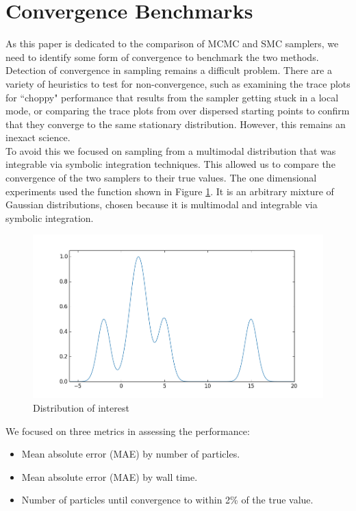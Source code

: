 \documentclass[12pt]{elsarticle}
\begin{document}
\section*{Convergence Benchmarks}
As this paper is dedicated to the comparison of MCMC and SMC samplers, we need to identify some form of convergence to benchmark the two methods. Detection of convergence in sampling remains a difficult problem.  There are a variety of heuristics to test for non-convergence, such as examining the trace plots for ``choppy" performance that results from the sampler getting stuck in a local mode, or comparing the trace plots from over dispersed starting points to confirm that they converge to the same stationary distribution. However, this remains an inexact science.\\

To avoid this we focused on sampling from a multimodal distribution that was integrable via symbolic integration techniques. This allowed us to compare the convergence of the two samplers to their true values. The one dimensional experiments used the function shown in Figure \ref{function}. It is an arbitrary mixture of Gaussian distributions, chosen because it is multimodal and integrable via symbolic integration.

\begin{figure}[htbp]
\begin{center}
\includegraphics[width = \textwidth]{plots/function.png}
\caption{Distribution of interest}
\label{function}
\end{center}
\end{figure}

We focused on three metrics in assessing the performance:
\begin{itemize}
\item Mean absolute error (MAE) by number of particles. 
\item Mean absolute error (MAE) by wall time. 
\item Number of particles until convergence to within 2\% of the true value. 
\end{itemize}
\end{document}
